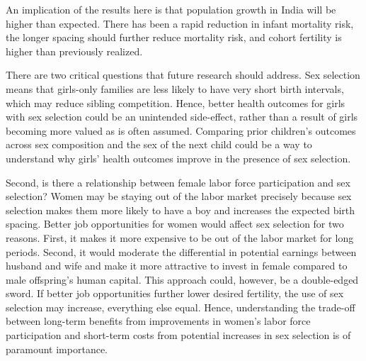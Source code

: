 \documentclass[12pt,letterpaper]{article}
\begin{document}
An implication of the results here is that population growth in India
will be higher than expected. There has been a rapid reduction in infant
mortality risk, the longer spacing should further reduce mortality risk,
and cohort fertility is higher than previously realized.



There are two critical questions that future research should address.
Sex selection means that girls-only families are less likely to have
very short birth intervals, which may reduce sibling competition. 
Hence, better health outcomes for girls with sex selection could be an
unintended side-effect, rather than a result of girls becoming more
valued as is often assumed. 
Comparing prior children's outcomes across
sex composition and the sex of the next child could be a way to
understand why girls' health outcomes improve in the presence of sex selection.

Second, is there a relationship between female labor force participation
and sex selection? Women may be staying out of the labor market
precisely because sex selection makes them more likely to have a boy and
increases the expected birth spacing. Better job opportunities for women
would affect sex selection for two reasons. First, it makes it more
expensive to be out of the labor market for long periods. Second, it
would moderate the differential in potential earnings between husband
and wife and make it more attractive to invest in female compared to
male offspring's human capital. This approach could, however, be a
double-edged sword. If better job opportunities further lower desired
fertility, the use of sex selection may increase, everything else equal.
Hence, understanding the trade-off between long-term benefits from
improvements in women's labor force participation and short-term costs
from potential increases in sex selection is of paramount importance.





\clearpage

\onehalfspacing


\end{document}

